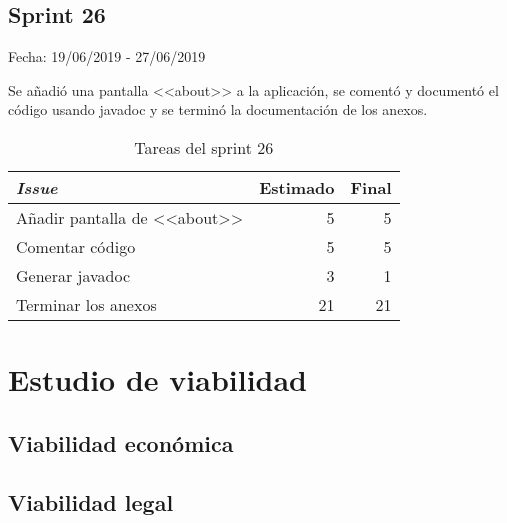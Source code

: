 \subsection{Sprint 26}

Fecha: 19/06/2019 - 27/06/2019

Se añadió una pantalla <<about>> a la aplicación, se comentó y documentó el código usando javadoc y se terminó la documentación de los anexos. 

\begin{table}[H]
	\begin{tabularx}{\textwidth}{Xrr}
		\toprule \textbf{\textit{Issue}} & \textbf{Estimado} & \textbf{Final}\\
		\toprule
		Añadir pantalla de <<about>> & 5 & 5 \\
		Comentar código & 5 & 5 \\
		Generar javadoc & 3 & 1 \\
		Terminar los anexos & 21 & 21 \\
		\bottomrule
	\end{tabularx}
	\caption{Tareas del sprint 26}
\end{table}

\section{Estudio de viabilidad}

\subsection{Viabilidad económica}

\subsection{Viabilidad legal}


